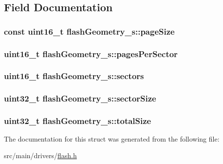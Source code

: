 \subsection{Field Documentation}
\hypertarget{structflashGeometry__s_a41534c29001f0490f5f8206ca567966a}{
\subsubsection[{page\+Size}]{\setlength{\rightskip}{0pt plus 5cm}const uint16\+\_\+t flash\+Geometry\+\_\+s\+::page\+Size}}\label{structflashGeometry__s_a41534c29001f0490f5f8206ca567966a}
\hypertarget{structflashGeometry__s_a1ceb96ef0ccf43eaf75501156b651b20}{
\subsubsection[{pages\+Per\+Sector}]{\setlength{\rightskip}{0pt plus 5cm}uint16\+\_\+t flash\+Geometry\+\_\+s\+::pages\+Per\+Sector}}\label{structflashGeometry__s_a1ceb96ef0ccf43eaf75501156b651b20}
\hypertarget{structflashGeometry__s_a6f5856fc447cad3f678cd6138671daee}{
\subsubsection[{sectors}]{\setlength{\rightskip}{0pt plus 5cm}uint16\+\_\+t flash\+Geometry\+\_\+s\+::sectors}}\label{structflashGeometry__s_a6f5856fc447cad3f678cd6138671daee}
\hypertarget{structflashGeometry__s_a4e3e22b4119139a1bc12683bd63fb5a2}{
\subsubsection[{sector\+Size}]{\setlength{\rightskip}{0pt plus 5cm}uint32\+\_\+t flash\+Geometry\+\_\+s\+::sector\+Size}}\label{structflashGeometry__s_a4e3e22b4119139a1bc12683bd63fb5a2}
\hypertarget{structflashGeometry__s_afd69c15d0f91048c7532dcb005578fca}{
\subsubsection[{total\+Size}]{\setlength{\rightskip}{0pt plus 5cm}uint32\+\_\+t flash\+Geometry\+\_\+s\+::total\+Size}}\label{structflashGeometry__s_afd69c15d0f91048c7532dcb005578fca}


The documentation for this struct was generated from the following file\+:\begin{DoxyCompactItemize}
\item 
src/main/drivers/\hyperlink{flash_8h}{flash.\+h}\end{DoxyCompactItemize}
